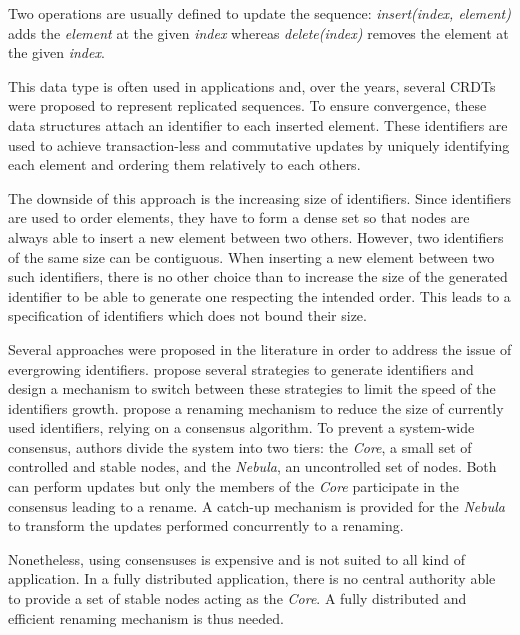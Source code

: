 \documentclass[sigplan]{acmart}
\begin{document}
Two operations are usually defined to update the sequence:
\emph{insert(index, element)} adds the \emph{element} at the given \emph{index}
whereas \emph{delete(index)} removes the element at the given \emph{index}.

This data type is often used in applications and, over the years, several \acp{CRDT} \cite{shapiro:inria-00177693, WeissICDCS09, AndreCollaborateCom2013} were proposed to represent replicated sequences.
To ensure convergence, these data structures attach an identifier to each inserted element.
These identifiers are used to achieve transaction-less and commutative updates by uniquely identifying each element and ordering them relatively to each others.

The downside of this approach is the increasing size of identifiers.
Since identifiers are used to order elements, they have to form a dense set so that nodes are always able to insert a new element between two others.
However, two identifiers of the same size can be contiguous.
When inserting a new element between two such identifiers, there is no other choice than to increase the size of the generated identifier to be able to generate one respecting the intended  order. This leads to a specification of identifiers which does not bound their size.

Several approaches were proposed in the literature in order to address the issue of evergrowing identifiers.
\citet{nedelec_2013_lseq} propose several strategies to generate identifiers and design a mechanism to switch between these strategies to limit the speed of the identifiers growth.
\citet{leia:inria-00397981} propose a renaming mechanism to reduce the size of currently used identifiers, relying on a consensus algorithm.
To prevent a system-wide consensus, authors divide the system into two tiers: the \emph{Core}, a small set of controlled and stable nodes, and the \emph{Nebula}, an uncontrolled set of nodes.
Both can perform updates but only the members of the \emph{Core} participate in the consensus leading to a rename.
A catch-up mechanism is provided for the \emph{Nebula} to transform the updates performed concurrently to a renaming.

Nonetheless, using consensuses is expensive and is not suited to all kind of application. In a fully distributed application, there is no central authority able to provide a set of stable nodes acting as the \emph{Core}. A fully distributed and efficient renaming mechanism is thus needed.
\end{document}
